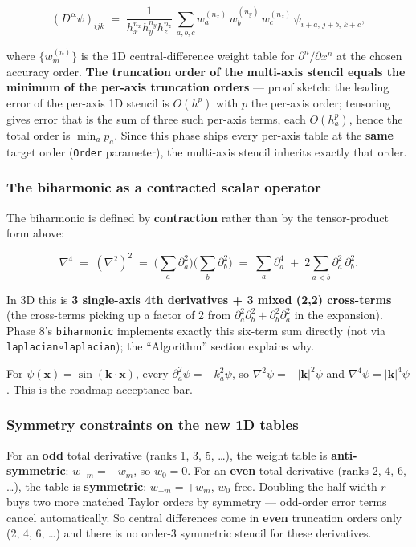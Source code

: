 \[
(D^{\boldsymbol\alpha}\psi)_{ijk} \;=\; \frac{1}{h_x^{n_x} h_y^{n_y} h_z^{n_z}}\,\sum_{a, b, c} w^{(n_x)}_a\,w^{(n_y)}_b\,w^{(n_z)}_c\,\psi_{i+a,\,j+b,\,k+c},
\]

where \(\{w^{(n)}_m\}\) is the 1D central-difference weight table for
\(\partial^n / \partial x^n\) at the chosen accuracy order. \textbf{The
truncation order of the multi-axis stencil equals the minimum of the
per-axis truncation orders} --- proof sketch: the leading error of the
per-axis 1D stencil is \(O(h^p)\) with \(p\) the per-axis order;
tensoring gives error that is the sum of three such per-axis terms, each
\(O(h_a^{p})\), hence the total order is \(\min_a p_a\). Since this
phase ships every per-axis table at the \textbf{same} target order
(\passthrough{\lstinline!Order!} parameter), the multi-axis stencil
inherits exactly that order.

\subsubsection{The biharmonic as a contracted scalar
operator}\label{the-biharmonic-as-a-contracted-scalar-operator}

The biharmonic is defined by \textbf{contraction} rather than by the
tensor-product form above:

\[
\nabla^4 \;=\; (\nabla^2)^2 \;=\; \biggl(\sum_a \partial_a^2\biggr)\biggl(\sum_b \partial_b^2\biggr) \;=\; \sum_a \partial_a^4 \;+\; 2\sum_{a < b} \partial_a^2\,\partial_b^2.
\]

In 3D this is \textbf{3 single-axis 4th derivatives + 3 mixed (2,2)
cross-terms} (the cross-terms picking up a factor of 2 from
\(\partial_a^2\partial_b^2 +
\partial_b^2\partial_a^2\) in the expansion). Phase 8's
\passthrough{\lstinline!biharmonic!} implements exactly this six-term
sum directly (not via \passthrough{\lstinline!laplacian∘laplacian!});
the ``Algorithm'' section explains why.

For \(\psi(\mathbf{x}) = \sin(\mathbf{k}\cdot\mathbf{x})\), every
\(\partial_a^2\psi = -k_a^2\psi\), so
\(\nabla^2\psi = -|\mathbf{k}|^2\psi\) and
\(\nabla^4\psi = |\mathbf{k}|^4\psi\). This is the roadmap acceptance
bar.

\subsubsection{Symmetry constraints on the new 1D
tables}\label{symmetry-constraints-on-the-new-1d-tables}

For an \textbf{odd} total derivative (ranks 1, 3, 5, \ldots), the weight
table is \textbf{anti-symmetric}: \(w_{-m} = -w_m\), so \(w_0 = 0\). For
an \textbf{even} total derivative (ranks 2, 4, 6, \ldots), the table is
\textbf{symmetric}: \(w_{-m} = +w_m\), \(w_0\) free. Doubling the
half-width \(r\) buys two more matched Taylor orders by symmetry ---
odd-order error terms cancel automatically. So central differences come
in \textbf{even} truncation orders only (2, 4, 6, \ldots) and there is
no order-3 symmetric stencil for these derivatives.

